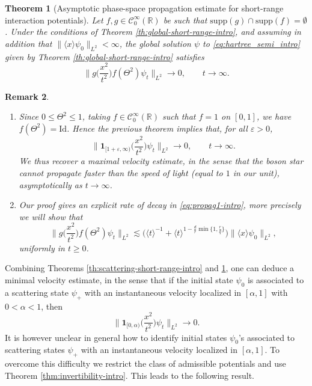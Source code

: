 \documentclass[12pt]{article}
\theoremstyle{plain}
\newtheorem{theo}{Theorem}[section]
\newtheorem{rem}[theo]{Remark}
\begin{document}
\begin{theo}[Asymptotic phase-space propagation estimate for short-range interaction potentials]\label{th:propag-est-intro}
Let $f,g\in \mathcal{C}_0^\infty(\mathbb{R})$ be such that $\mathrm{supp}(g)\cap\mathrm{supp}(f)=\emptyset$. Under the conditions of Theorem \ref{th:global-short-range-intro}, and assuming in addition that $\|\langle x\rangle\psi_0\|_{L^2}<\infty$, the global solution $\psi$ to \eqref{eq:hartree_semi_intro} given by Theorem \ref{th:global-short-range-intro} satisfies
\begin{equation}\label{eq:propag1-intro}
\Big\|g\Big(\frac{x^2}{t^2}\Big)f(\Theta^2) \psi_t\Big\|_{L^2} \to0, \qquad t\to\infty.
\end{equation}
\end{theo}


\begin{rem}\label{rem:asympt_max-vel}$ $
\begin{enumerate}
\item Since $0\le \Theta^2\le1$, %
taking $f\in \mathcal{C}_0^\infty(\mathbb{R})$ such that $f=1$ on $[0,1]$, we have $f(\Theta^2)=\mathrm{Id}$. Hence the previous theorem implies that, for all $\varepsilon>0$,
\begin{equation*}
\Big\|\mathbf{1}_{[1+\varepsilon,\infty)}\Big(\frac{x^2}{t^2}\Big) \psi_t\Big\|_{L^2} \to0, \qquad t\to\infty.
\end{equation*}
We thus recover a maximal velocity estimate, in the sense that the boson star cannot propagate faster than the speed of light (equal to $1$ in our unit), asymptotically as $t\to\infty$.
\item Our proof gives an explicit rate of decay in \eqref{eq:propag1-intro}, more precisely we will show that
\begin{equation*}
\Big\|g\Big(\frac{x^2}{t^2}\Big)f(\Theta^2) \psi_t\Big\|_{L^2} \lesssim \big(\langle t \rangle^{-1} + \langle  t\rangle^{1-\frac{d}{r}\min\{1, \frac{r}{q}\}}\big)\|\langle x\rangle\psi_0\|_{L^2},
\end{equation*}
uniformly in $t\ge0$.
\end{enumerate}
\end{rem}

Combining Theorems \ref{th:scattering-short-range-intro} and \ref{th:propag-est-intro}, one can deduce a minimal velocity estimate, in the sense that if the initial state $\psi_0$ is associated to a scattering state $\psi_+$ with an instantaneous velocity localized in $[\alpha,1]$ with $0<\alpha<1$, then 
\begin{equation*}
\Big\|\mathbf{1}_{[0,\alpha)}\Big(\frac{x^2}{t^2}\Big) \psi_t\Big\|_{L^2} \to 0.
\end{equation*}
It is however unclear in general how to identify initial states $\psi_0$'s associated to scattering states $\psi_+$ with an instantaneous velocity localized in $[\alpha,1]$. To overcome this difficulty we restrict the class of admissible potentials and use Theorem \ref{thm:invertibility-intro}. This leads to the following result.
\end{document}
